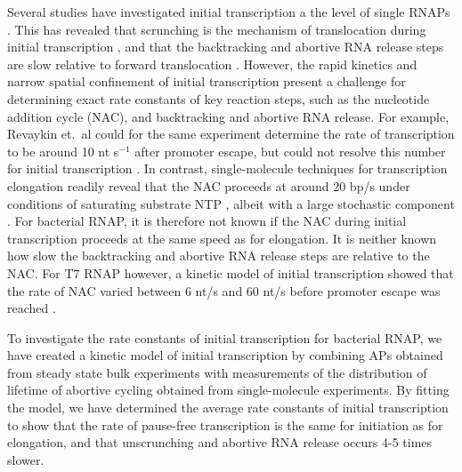 Several studies have investigated initial transcription a the level of single
RNAPs \cite{kapanidis_retention_2005, margeat_direct_2006,
revyakin_abortive_2006, tang_real-time_2009, kapanidis_initial_2006}. This has
revealed that scrunching is the mechanism of translocation during initial
transcription \cite{revyakin_abortive_2006, kapanidis_initial_2006}, and that
the backtracking and abortive RNA release steps are slow relative to forward
translocation \cite{margeat_direct_2006, revyakin_abortive_2006}. However, the
rapid kinetics and narrow spatial confinement of initial transcription
present a challenge for determining exact rate constants of key reaction
steps, such as the nucleotide addition cycle (NAC), and backtracking and
abortive RNA release. For example, Revaykin et.\ al could for the same
experiment determine the rate of transcription to be around 10 nt s$^{-1}$
after promoter escape, but could not resolve this number for initial
transcription \cite{revyakin_abortive_2006}. In contrast, single-molecule
techniques for transcription elongation readily reveal that the NAC proceeds
at around 20 bp/s under conditions of saturating substrate NTP
\cite{bai_mechanochemical_2007, mejia_trigger_2014}, albeit with a large
stochastic component \cite{tolic-norrelykke_diversity_2004}. For bacterial
RNAP, it is therefore not known if the NAC during initial transcription
proceeds at the same speed as for elongation. It is neither known how slow the
backtracking and abortive RNA release steps are relative to the NAC. For T7
RNAP however, a kinetic model of initial transcription showed that the rate of
NAC varied between 6 nt/s and 60 nt/s before promoter escape was reached
\cite{tang_real-time_2009}. 

To investigate the rate constants of initial transcription for bacterial RNAP,
we have created a kinetic model of initial transcription by combining APs
obtained from steady state bulk experiments with measurements of the
distribution of lifetime of abortive cycling obtained from single-molecule
experiments. By fitting the model, we have determined the average rate
constants of initial transcription to show that the rate of pause-free
transcription is the same for initiation as for elongation, and that
unscrunching and abortive RNA release occurs 4-5 times slower.
